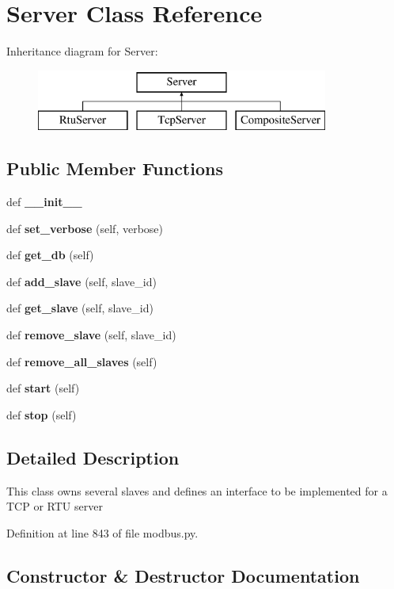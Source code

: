 \section{Server Class Reference}
\label{classprotolibs_1_1modbus__tk_1_1modbus_1_1_server}
Inheritance diagram for Server\+:\begin{figure}[H]
\begin{center}
\leavevmode
\includegraphics[height=2.000000cm]{classprotolibs_1_1modbus__tk_1_1modbus_1_1_server}
\end{center}
\end{figure}
\subsection*{Public Member Functions}
\begin{DoxyCompactItemize}
\item 
def {\bf \+\_\+\+\_\+init\+\_\+\+\_\+}
\item 
def {\bf set\+\_\+verbose} (self, verbose)
\item 
def {\bf get\+\_\+db} (self)
\item 
def {\bf add\+\_\+slave} (self, slave\+\_\+id)
\item 
def {\bf get\+\_\+slave} (self, slave\+\_\+id)
\item 
def {\bf remove\+\_\+slave} (self, slave\+\_\+id)
\item 
def {\bf remove\+\_\+all\+\_\+slaves} (self)
\item 
def {\bf start} (self)
\item 
def {\bf stop} (self)
\end{DoxyCompactItemize}


\subsection{Detailed Description}
\begin{DoxyVerb}This class owns several slaves and defines an interface
to be implemented for a TCP or RTU server
\end{DoxyVerb}
 

Definition at line 843 of file modbus.\+py.



\subsection{Constructor \& Destructor Documentation}
